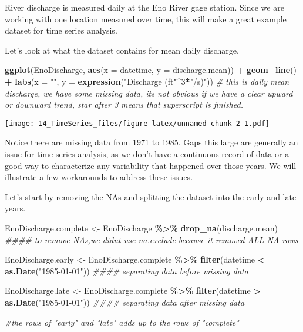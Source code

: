 \documentclass[
]{article}
\newenvironment{Shaded}{\begin{snugshade}}{\end{snugshade}}
\newcommand{\CommentTok}[1]{\textcolor[rgb]{0.56,0.35,0.01}{\textit{#1}}}
\newcommand{\DataTypeTok}[1]{\textcolor[rgb]{0.13,0.29,0.53}{#1}}
\newcommand{\DecValTok}[1]{\textcolor[rgb]{0.00,0.00,0.81}{#1}}
\newcommand{\KeywordTok}[1]{\textcolor[rgb]{0.13,0.29,0.53}{\textbf{#1}}}
\newcommand{\NormalTok}[1]{#1}
\newcommand{\OperatorTok}[1]{\textcolor[rgb]{0.81,0.36,0.00}{\textbf{#1}}}
\newcommand{\StringTok}[1]{\textcolor[rgb]{0.31,0.60,0.02}{#1}}
\begin{document}
River discharge is measured daily at the Eno River gage station. Since
we are working with one location measured over time, this will make a
great example dataset for time series analysis.

Let's look at what the dataset contains for mean daily discharge.

\begin{Shaded}
\begin{Highlighting}[]
\KeywordTok{ggplot}\NormalTok{(EnoDischarge, }\KeywordTok{aes}\NormalTok{(}\DataTypeTok{x =}\NormalTok{ datetime, }\DataTypeTok{y =}\NormalTok{ discharge.mean)) }\OperatorTok{+}
\StringTok{  }\KeywordTok{geom\_line}\NormalTok{() }\OperatorTok{+}
\StringTok{  }\KeywordTok{labs}\NormalTok{(}\DataTypeTok{x =} \StringTok{""}\NormalTok{, }\DataTypeTok{y =} \KeywordTok{expression}\NormalTok{(}\StringTok{"Discharge (ft"}\OperatorTok{\^{}}\DecValTok{3}\OperatorTok{*}\StringTok{"/s)"}\NormalTok{)) }\CommentTok{\# this is daily mean discharge, we have some missing data, its not obvious if we have a clear upward or downward trend, star after 3 means that superscript is finished.}
\end{Highlighting}
\end{Shaded}

\texttt{[image: 14\_TimeSeries\_files/figure-latex/unnamed-chunk-2-1.pdf]}

Notice there are missing data from 1971 to 1985. Gaps this large are
generally an issue for time series analysis, as we don't have a
continuous record of data or a good way to characterize any variability
that happened over those years. We will illustrate a few workarounds to
address these issues.

Let's start by removing the NAs and splitting the dataset into the early
and late years.

\begin{Shaded}
\begin{Highlighting}[]
\NormalTok{EnoDischarge.complete <{-}}\StringTok{ }\NormalTok{EnoDischarge }\OperatorTok{\%>\%}
\StringTok{  }\KeywordTok{drop\_na}\NormalTok{(discharge.mean) }\CommentTok{\#\#\#\# to remove NA\textquotesingle{}s,we didnt use na.exclude because it removed ALL NA rows}

\NormalTok{EnoDischarge.early <{-}}\StringTok{ }\NormalTok{EnoDischarge.complete }\OperatorTok{\%>\%}
\StringTok{  }\KeywordTok{filter}\NormalTok{(datetime }\OperatorTok{<}\StringTok{ }\KeywordTok{as.Date}\NormalTok{(}\StringTok{"1985{-}01{-}01"}\NormalTok{)) }\CommentTok{\#\#\#\# separating data before missing data}

\NormalTok{EnoDischarge.late <{-}}\StringTok{ }\NormalTok{EnoDischarge.complete }\OperatorTok{\%>\%}
\StringTok{  }\KeywordTok{filter}\NormalTok{(datetime }\OperatorTok{>}\StringTok{ }\KeywordTok{as.Date}\NormalTok{(}\StringTok{"1985{-}01{-}01"}\NormalTok{)) }\CommentTok{\#\#\#\# separating data after missing data}

\CommentTok{\#the rows of "early" and "late" adds up to the rows of "complete"}
\end{Highlighting}
\end{Shaded}
\end{document}
